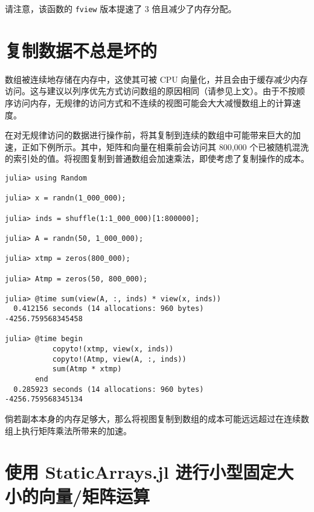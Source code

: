请注意，该函数的 \texttt{fview} 版本提速了 3 倍且减少了内存分配。



\hypertarget{12328390677917528950}{}


\section{复制数据不总是坏的}



数组被连续地存储在内存中，这使其可被 CPU 向量化，并且会由于缓存减少内存访问。这与建议以列序优先方式访问数组的原因相同（请参见上文）。由于不按顺序访问内存，无规律的访问方式和不连续的视图可能会大大减慢数组上的计算速度。



在对无规律访问的数据进行操作前，将其复制到连续的数组中可能带来巨大的加速，正如下例所示。其中，矩阵和向量在相乘前会访问其 800,000 个已被随机混洗的索引处的值。将视图复制到普通数组会加速乘法，即使考虑了复制操作的成本。




\begin{verbatim}
julia> using Random

julia> x = randn(1_000_000);

julia> inds = shuffle(1:1_000_000)[1:800000];

julia> A = randn(50, 1_000_000);

julia> xtmp = zeros(800_000);

julia> Atmp = zeros(50, 800_000);

julia> @time sum(view(A, :, inds) * view(x, inds))
  0.412156 seconds (14 allocations: 960 bytes)
-4256.759568345458

julia> @time begin
           copyto!(xtmp, view(x, inds))
           copyto!(Atmp, view(A, :, inds))
           sum(Atmp * xtmp)
       end
  0.285923 seconds (14 allocations: 960 bytes)
-4256.759568345134
\end{verbatim}



倘若副本本身的内存足够大，那么将视图复制到数组的成本可能远远超过在连续数组上执行矩阵乘法所带来的加速。



\hypertarget{11940955685871814254}{}


\section{使用 StaticArrays.jl 进行小型固定大小的向量/矩阵运算}



